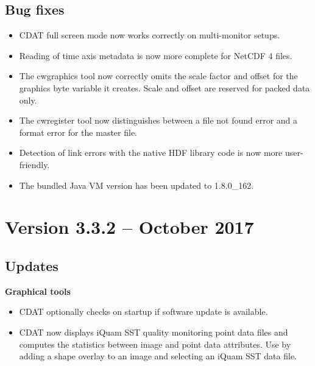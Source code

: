 \subsection*{ Bug fixes}
\begin{itemize}

  \item CDAT full screen mode now works correctly on multi-monitor setups.

  \item Reading of time axis metadata is now more complete for NetCDF 4 files.

  \item The cwgraphics tool now correctly omits the scale factor and offset
  for the graphics byte variable it creates.  Scale and offset are reserved
  for packed data only.

  \item The cwregister tool now distinguishes between a file not found error
  and a format error for the master file.

  \item Detection of link errors with the native HDF library code is now more
  user-friendly.

  \item The bundled Java VM version has been updated to 1.8.0\_162.

\end{itemize}


\section{Version 3.3.2 -- October 2017}

\subsection*{ Updates}

\hspace{0.4cm} {\bf Graphical tools}

\begin{itemize}

  \item CDAT optionally checks on startup if software update is available.

  \item CDAT now displays iQuam SST quality monitoring point data files and
  computes the statistics between image and point data attributes.  Use
  by adding a shape overlay to an image and selecting an iQuam SST data file.

\end{itemize}


